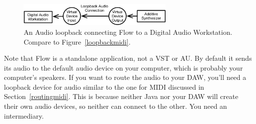 \documentclass{article}
\newcommand\bump{\vspace{20in}}
\newcommand\name{Flow}
\begin{document}
\begin{figure}
\begin{center}\vspace{-2em}\includegraphics[width=3in]{loopbackaudio}\end{center}
\vspace{-1em}
\caption{An Audio loopback connecting {\name} to a Digital Audio Workstation.  Compare to Figure~\ref{loopbackmidi}.}\label{loopbackaudio}
\end{figure}

Note that {\name} is a standalone application, not a VST or AU.  By default it sends its audio to the default audio device on your computer, which is probably your computer's speakers.  If you want to route the audio to your DAW, you'll need a loopback device for audio similar to the one for MIDI discussed in Section~\ref{routingmidi}.  This is because neither Java nor your DAW will create their own audio devices, so neither can connect to the other.  You need an intermediary.


\bump
\end{document}
